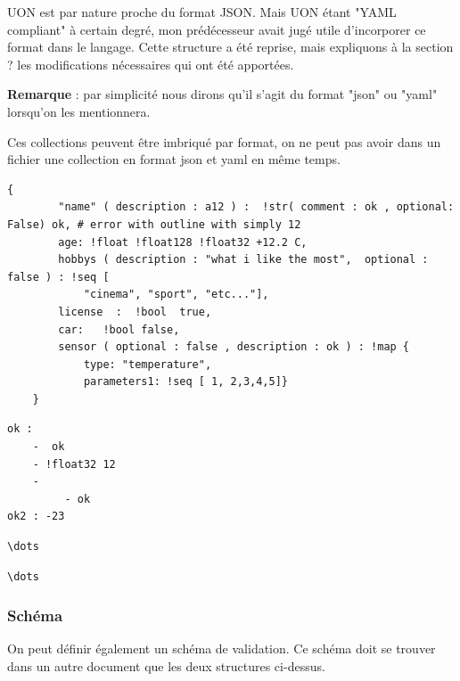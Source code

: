 \documentclass[
    iict, %
    il, %
]{heig-tb}
\begin{document}
UON est par nature proche du format JSON. Mais UON étant "YAML compliant" à certain degré, mon prédécesseur avait jugé utile d'incorporer ce format
dans le langage. Cette structure a été reprise, mais expliquons à la section ? %
les modifications nécessaires qui ont été apportées.

\textbf{Remarque} : par simplicité nous dirons qu'il s'agit du format "json" ou "yaml" lorsqu'on les mentionnera.

Ces collections peuvent être imbriqué par format, on ne peut pas avoir dans un fichier une collection en format json et yaml en même temps.


\begin{lstlisting}[frame=single,caption={json-map},label={json-map}]
    {
        "name" ( description : a12 ) :  !str( comment : ok , optional: False) ok, # error with outline with simply 12
        age: !float !float128 !float32 +12.2 C,
        hobbys ( description : "what i like the most",  optional : false ) : !seq [
            "cinema", "sport", "etc..."],
        license  :  !bool  true,
        car:   !bool false,
        sensor ( optional : false , description : ok ) : !map {
            type: "temperature",
            parameters1: !seq [ 1, 2,3,4,5]}
    }
\end{lstlisting}

\begin{lstlisting}[frame=single,caption={yaml-map},label={yaml-map}]
ok :
    -  ok
    - !float32 12
    -
         - ok
ok2 : -23
\end{lstlisting}



\begin{lstlisting}[frame=single,caption={json-seq},label={json-seq}]
\dots
\end{lstlisting}


\begin{lstlisting}[frame=single,caption={yaml-seq},label={yaml-seq}]
\dots
\end{lstlisting}


\subsubsection{Schéma}
On peut définir également un schéma de validation. Ce schéma doit se trouver dans un autre document que les deux structures ci-dessus.
\end{document}

